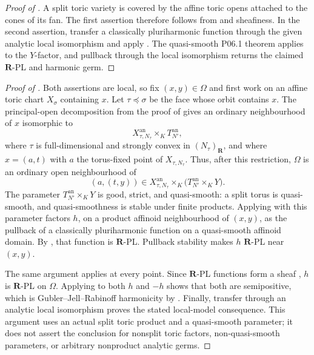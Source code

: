 \begin{proof}[Proof of ]
A split toric variety is covered by the affine toric opens attached to
the cones of its fan.  The first assertion therefore follows from
 and sheafiness.  In the second
assertion, transfer a classically pluriharmonic function through the
given analytic local isomorphism and apply
.  The quasi-smooth
P06.1 theorem applies to the \(Y\)-factor, and pullback through the local
isomorphism returns the claimed \(\mathbf R\)-PL and harmonic germ.
\end{proof}

\begin{proof}[Proof of ]
Both assertions are local, so fix \((x,y)\in\Omega\) and first work on an
affine toric chart \(X_\sigma\) containing \(x\).  Let
\(\tau\preceq\sigma\) be the face whose orbit contains \(x\).  The
principal-open decomposition from the proof of
 gives an ordinary neighbourhood of
\(x\) isomorphic to
\[
 X_{\tau,N_\tau}^{\mathrm{an}}\times_KT_{N'}^{\mathrm{an}},
\]
where \(\tau\) is full-dimensional and strongly convex in
\((N_\tau)_{\mathbf R}\), and where \(x=(a,t)\) with \(a\) the
torus-fixed point of \(X_{\tau,N_\tau}\).  Thus, after this restriction,
\(\Omega\) is an ordinary open neighbourhood of
\[
 (a,(t,y))\in
 X_{\tau,N_\tau}^{\mathrm{an}}
 \times_K\bigl(T_{N'}^{\mathrm{an}}\times_KY\bigr).
\]
The parameter \(T_{N'}^{\mathrm{an}}\times_KY\) is good, strict, and
quasi-smooth: a split torus is quasi-smooth, and quasi-smoothness is stable
under finite products.  Applying
 with this parameter factors
\(h\), on a product affinoid neighbourhood of \((x,y)\), as the pullback
of a classically pluriharmonic function on a quasi-smooth affinoid domain.
By , that function is
\(\mathbf R\)-PL.  Pullback stability
\cite[Lemma~5.4(1)]{GJR26} makes \(h\) \(\mathbf R\)-PL near \((x,y)\).

The same argument applies at every point.  Since \(\mathbf R\)-PL
functions form a sheaf \cite[\S5.2(4)]{GJR26}, \(h\) is
\(\mathbf R\)-PL on \(\Omega\).  Applying
\cite[Theorem~4.3]{GR25Classical} to both \(h\) and \(-h\) shows that
both are semipositive, which is Gubler--Jell--Rabinoff harmonicity by
\cite[Definition~7.2]{GJR26}.  Finally, transfer through an analytic local
isomorphism proves the stated local-model consequence.  This argument uses
an actual split toric product and a quasi-smooth parameter; it does not
assert the conclusion for nonsplit toric factors, non-quasi-smooth
parameters, or arbitrary nonproduct analytic germs.
\end{proof}

